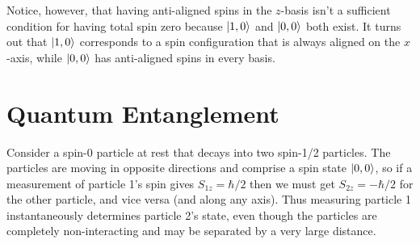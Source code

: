 \documentclass[../p116main.tex]{subfiles}
\begin{document}
Notice, however, that having anti-aligned spins in the $z$-basis isn't a sufficient condition for having total spin zero because $\left| 1,0 \right>$ and $\left| 0,0 \right>$ both exist.
It turns out that $\left| 1,0 \right>$ corresponds to a spin configuration that is always aligned on the $x$-axis, while $\left| 0,0 \right>$ has anti-aligned spins in every basis.

\section{Quantum Entanglement}
Consider a spin-0 particle at rest that decays into two spin-1/2 particles.
The particles are moving in opposite directions and comprise a spin state $\left| 0,0 \right>$, so if a measurement of particle 1's spin gives $S_{1z} = \hbar / 2$ then we must get $S_{2z} = -\hbar / 2$ for the other particle, and vice versa (and along any axis).
Thus measuring particle 1 instantaneously determines particle 2's state, even though the particles are completely non-interacting and may be separated by a very large distance.
\end{document}
